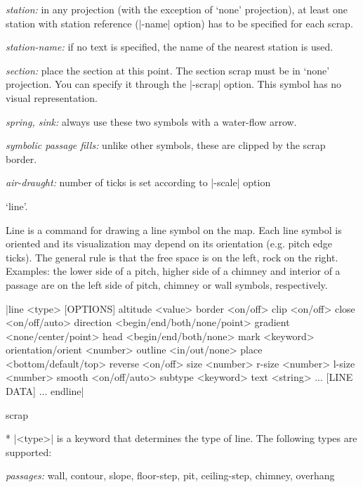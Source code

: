       {\it station:} in any projection (with the exception of `none' projection),
      at least one station with station reference (|-name| option) has 
      to be specified for each scrap.
        
      {\it station-name:} if no text is specified, the name of the nearest
      station is used.
        
      {\it section:} place the section at this point. The section scrap
      must be in `none' projection. You can specify it through the |-scrap|
      option. This symbol has no visual representation.
        
      {\it spring, sink:} always use these two symbols with a water-flow
      arrow.
        
      {\it symbolic passage fills:} unlike other symbols, these are
      clipped by the scrap border.

      {\it  air-draught:} number of ticks is set according to |-scale| option

  \endlist
\endnotes


\subsubchapter `line'.

\description
Line is a command for drawing a line symbol on the map. Each line symbol is 
oriented and its visualization may depend on its orientation (e.g. pitch edge 
ticks). The general rule is that the free space is on the left, rock on the 
right. Examples: the lower side of a pitch, higher side of a chimney and 
interior of a passage are on the left side of pitch, chimney or wall symbols, 
respectively.  
\enddescription

\syntax
  |line <type> [OPTIONS]
         altitude <value>
         border <on/off>
         clip <on/off>
         close <on/off/auto>
         direction <begin/end/both/none/point>
         gradient <none/center/point>
         head <begin/end/both/none>
         mark <keyword>
         orientation/orient <number>
         outline <in/out/none>
         place <bottom/default/top>
         reverse <on/off>
         size <number>
         r-size <number>
         l-size <number>
         smooth <on/off/auto>
         subtype <keyword>
         text <string>
         ...
         [LINE DATA]
         ...
       endline|
\endsyntax

\context
  scrap
\endcontext

\arguments
   * |<type>| is a keyword that determines the type of line.
     The following types are supported: 
     
     {\it passages:} wall, contour, slope, floor-step, pit, ceiling-step, 
     chimney, overhang

